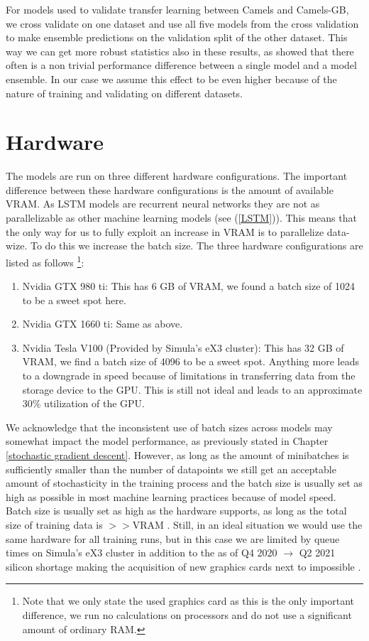 For models used to validate transfer learning between Camels and Camels-GB, we 
cross validate on one dataset and use all five models from the cross validation 
to make ensemble predictions on the validation split of the other dataset. This 
way we can get more robust statistics also in these results, as \cite{lstm_second_paper} 
showed that there often is a non trivial performance difference between a single
model and a model ensemble. In our case we assume this effect to be even higher 
because of the nature of training and validating on different datasets.

\section{Hardware}
The models are run on three different hardware configurations. The important difference 
between these hardware configurations is the amount of available VRAM. As LSTM models 
are recurrent neural networks they are not as parallelizable as other machine learning 
models (see (\ref{LSTM})). This means that the only way for us to fully exploit 
an increase in VRAM is to parallelize data-wize. To do this we increase the batch size.
The three hardware configurations are listed as follows \footnote{Note that we only 
state the used graphics card as this is the only important difference, we run no 
calculations on processors and do not use a significant amount of ordinary RAM.}:
\begin{enumerate}
    \item Nvidia GTX 980 ti: This has 6 GB of VRAM, we found a batch size of 1024 
        to be a sweet spot here.
    \item Nvidia GTX 1660 ti: Same as above.
    \item Nvidia Tesla V100 (Provided by Simula's eX3 cluster): This has 32 GB of VRAM, we find a batch size of 4096 
        to be a sweet spot. Anything more leads to a downgrade in speed because 
        of limitations in transferring data from the storage device to the GPU. 
        This is still not ideal and leads to an approximate 30\% utilization of the 
        GPU.
\end{enumerate}
We acknowledge that the inconsistent use of batch sizes across models may somewhat 
impact the model performance, as previously stated in Chapter \ref{stochastic gradient descent}.
However, as long as the amount of minibatches is sufficiently smaller than the number of datapoints we 
still get an acceptable amount of stochasticity in the training process and the batch 
size is usually set as high as possible in most machine learning practices because 
of model speed. Batch size is usually set as high as the hardware supports, as long 
as the total size of training data is $>>$VRAM \citationneeded.
Still, in an ideal situation we would use the same hardware for all training runs, 
but in this case we are limited by queue times on Simula's eX3 cluster in addition 
to the as of Q4 2020 $\rightarrow$ Q2 2021 silicon shortage making the acquisition of 
new graphics cards next to impossible \cite{GPUShortage}.
